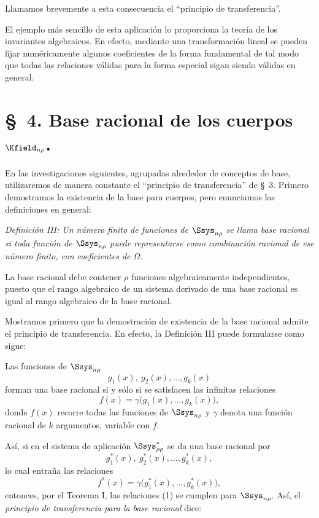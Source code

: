 \documentclass[11pt]{article}
\begin{document}
Llamamos brevemente a esta consecuencia el ``principio de transferencia''.

\providecommand{\Lsys}{\mathfrak{L}}
\providecommand{\Jdom}{\mathfrak{J}}

\clearpage
El ejemplo más sencillo de esta aplicación lo proporciona la teoría de los invariantes algebraicos. En efecto, mediante una transformación lineal se pueden fijar numéricamente algunos coeficientes de la forma fundamental de tal modo que todas las relaciones válidas para la forma especial sigan siendo válidas en general.

\section*{\S\ 4. Base racional de los cuerpos $\Kfield_{n\rho}$.}

En las investigaciones siguientes, agrupadas alrededor de conceptos de base, utilizaremos de manera constante el ``principio de transferencia'' de \S\ 3. Primero demostramos la existencia de la base para cuerpos, pero enunciamos las definiciones en general:

\emph{Definición III: Un número finito de funciones de $\Ssys_{n\rho}$ se llama base racional si toda función de $\Ssys_{n\rho}$ puede representarse como combinación racional de ese número finito, con coeficientes de $\Omega$.}

La base racional debe contener $\rho$ funciones algebraicamente independientes, puesto que el rango algebraico de un sistema derivado de una base racional es igual al rango algebraico de la base racional.

Mostramos primero que la demostración de existencia de la base racional admite el principio de transferencia. En efecto, la Definición III puede formularse como sigue:

Las funciones de $\Ssys_{n\rho}$
\[
  g_1(x),\ g_2(x),\ldots, g_k(x)
\]
forman una base racional si y sólo si se satisfacen las infinitas relaciones
\begin{equation}
  f(x)=\gamma\bigl(g_1(x),\ldots,g_k(x)\bigr),
\tag{1}
\end{equation}
donde $f(x)$ recorre todas las funciones de $\Ssys_{n\rho}$ y $\gamma$ denota una función racional de $k$ argumentos, variable con $f$.

Así, si en el sistema de aplicación $\Ssys^*_{\rho\rho}$ se da una base racional por
\[
  g_1^*(x),\ g_2^*(x),\ldots,g_k^*(x),
\]
lo cual entraña las relaciones
\[
  f^*(x)=\gamma\bigl(g_1^*(x),\ldots,g_k^*(x)\bigr),
\]
entonces, por el Teorema I, las relaciones (1) se cumplen para $\Ssys_{n\rho}$. Así, el \emph{principio de transferencia para la base racional} dice:
\end{document}
